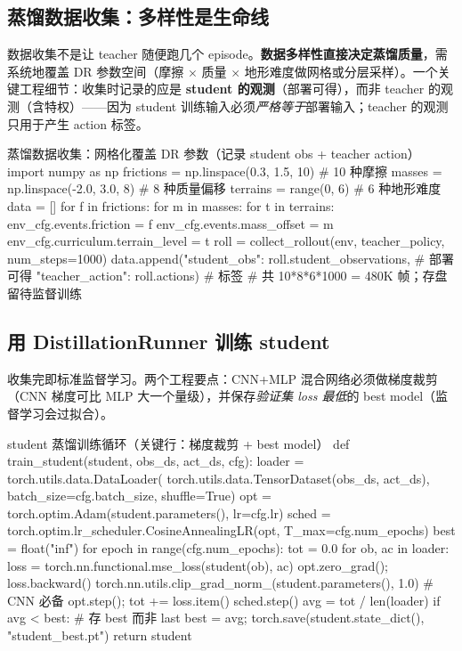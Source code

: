 \subsection{蒸馏数据收集：多样性是生命线}
\label{sec:rlmc-priv-collect}

数据收集不是让 teacher 随便跑几个 episode。\textbf{数据多样性直接决定蒸馏质量}，需系统地覆盖 DR 参数空间（摩擦 $\times$ 质量 $\times$ 地形难度做网格或分层采样）。一个关键工程细节：收集时记录的应是 \textbf{student 的观测}（部署可得），而非 teacher 的观测（含特权）——因为 student 训练输入必须\emph{严格等于}部署输入；teacher 的观测只用于产生 action 标签。

\begin{codebox}[Python]{蒸馏数据收集：网格化覆盖 DR 参数（记录 student obs + teacher action）}
import numpy as np
frictions = np.linspace(0.3, 1.5, 10)      # 10 种摩擦
masses    = np.linspace(-2.0, 3.0, 8)      # 8 种质量偏移
terrains  = range(0, 6)                     # 6 种地形难度
data = []
for f in frictions:
    for m in masses:
        for t in terrains:
            env_cfg.events.friction = f
            env_cfg.events.mass_offset = m
            env_cfg.curriculum.terrain_level = t
            roll = collect_rollout(env, teacher_policy, num_steps=1000)
            data.append({"student_obs":   roll.student_observations,  # 部署可得
                         "teacher_action": roll.actions})             # 标签
# 共 10*8*6*1000 = 480K 帧；存盘留待监督训练
\end{codebox}

\subsection{用 DistillationRunner 训练 student}
\label{sec:rlmc-priv-trainstudent}

收集完即标准监督学习。两个工程要点：CNN+MLP 混合网络必须做梯度裁剪（CNN 梯度可比 MLP 大一个量级），并保存\emph{验证集 loss 最低}的 best model（监督学习会过拟合）。

\begin{codebox}[Python]{student 蒸馏训练循环（关键行：梯度裁剪 + best model）}
def train_student(student, obs_ds, act_ds, cfg):
    loader = torch.utils.data.DataLoader(
        torch.utils.data.TensorDataset(obs_ds, act_ds),
        batch_size=cfg.batch_size, shuffle=True)
    opt = torch.optim.Adam(student.parameters(), lr=cfg.lr)
    sched = torch.optim.lr_scheduler.CosineAnnealingLR(opt, T_max=cfg.num_epochs)
    best = float("inf")
    for epoch in range(cfg.num_epochs):
        tot = 0.0
        for ob, ac in loader:
            loss = torch.nn.functional.mse_loss(student(ob), ac)
            opt.zero_grad(); loss.backward()
            torch.nn.utils.clip_grad_norm_(student.parameters(), 1.0)  # CNN 必备
            opt.step(); tot += loss.item()
        sched.step()
        avg = tot / len(loader)
        if avg < best:                                   # 存 best 而非 last
            best = avg; torch.save(student.state_dict(), "student_best.pt")
    return student
\end{codebox}

